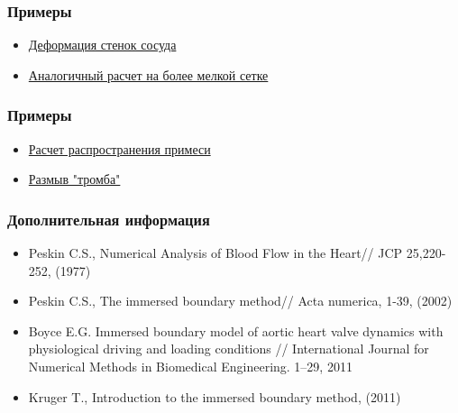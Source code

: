 \documentclass[14pt]{beamer}
\begin{document}
\begin{frame}
\frametitle{Примеры}
\begin{itemize}
    \item \href{run:video/cylinder1.avi}{Деформация стенок сосуда}
    \item \href{run:video/cylinder2.avi}{Аналогичный расчет на более мелкой сетке}
\end{itemize}
\end{frame}

\begin{frame}
\frametitle{Примеры}
\begin{itemize}
    \item \href{run:video/source_in_vessel.avi}{Расчет распространения примеси}
    \item \href{run:video/thrombus_in_vessel.avi}{Размыв "тромба"}
\end{itemize}
\end{frame}

\begin{frame}
\frametitle{Дополнительная информация}
    \begin{itemize}
        \item Peskin C.S., Numerical Analysis of Blood Flow in the Heart// JCP 25,220-252, (1977)
        \item Peskin C.S., The immersed boundary method// Acta numerica, 1-39, (2002)
        \item Boyce E.G. Immersed boundary model of aortic heart valve dynamics with physiological driving and loading conditions // International Journal for Numerical Methods in Biomedical Engineering. 1–29, 2011
        \item Kruger T., Introduction to the immersed boundary method, (2011)
    \end{itemize}
\end{frame}
\end{document}
